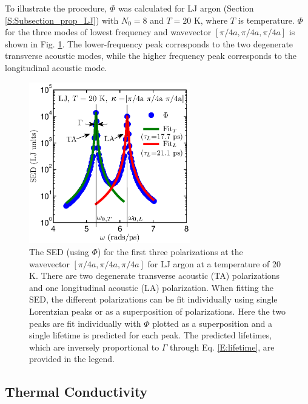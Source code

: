 \documentclass[12pt,twocolumn,iop]{/usr/share/texmf-texlive/tex/latex/iop/iopart}[/usr/share/texmf-texlive/tex/latex/iop/]
\begin{document}
To illustrate the procedure, $\Phi$ was calculated for LJ argon (Section \ref{S:Subsection_prop_LJ}) with $N_0=8$ and $T=20$ K, where $T$ is temperature. $\Phi$ for the three modes of lowest frequency and wavevector $[\pi/4a,\pi/4a,\pi/4a]$ is shown in Fig$.$ \ref{F:LJ_FIT_PEAK}. The lower-frequency peak corresponds to the two degenerate transverse acoustic modes, while the higher frequency peak corresponds to the longitudinal acoustic mode.\cite{dove1993}

\vspace*{0mm}

\begin{figure}
\begin{center}
\includegraphics[angle=0,width=70.0mm]{figure1.eps}
\end{center}
\caption{\label{F:LJ_FIT_PEAK} The SED (using $\Phi$) for the first three polarizations at the wavevector $[\pi/4a,\pi/4a,\pi/4a]$ for LJ argon at a temperature of 20 K. There are two degenerate transverse acoustic (TA) polarizations and one longitudinal acoustic (LA) polarization. When fitting the SED, the different polarizations can be fit individually using single Lorentzian peaks or as a superposition of polarizations. Here the two peaks are fit individually with $\Phi$ plotted as a superposition and a single lifetime is predicted for each peak. The predicted lifetimes, which are inversely proportional to $\Gamma$ through Eq$.$ \eqref{E:lifetime}, are provided in the legend.}
\end{figure}



\subsection{\label{Subsection_Comp_Details_3}Thermal Conductivity}
\end{document}
